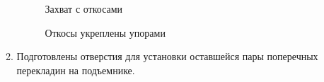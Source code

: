 \begin{enumerate}
\begin{enumerate}
      \begin{figure}[H]
      	\begin{minipage}[h]{0.47\linewidth}
      		\caption{Захват с откосами}
      	\end{minipage}
      	\hfill
      	\begin{minipage}[h]{0.47\linewidth}
      		\caption{Откосы укреплены упорами}
      	\end{minipage}
      \end{figure}
      
      \item Подготовлены отверстия для установки оставшейся пары поперечных перекладин на подъемнике.
      
    \end{enumerate}
    

\end{enumerate}
